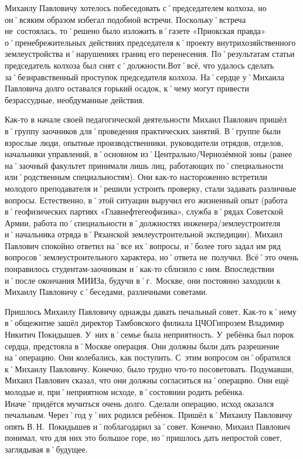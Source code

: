 Михаилу Павловичу хотелось побеседовать с˚председателем колхоза, но он˚всяким образом избегал подобной встречи. Поскольку˚встреча не~состоялась, то˚решено было изложить в˚газете «Приокская правда» о˚пренебрежительных действиях председателя к˚проекту внутрихозяйственного землеустройства и˚нарушениях границ его перенесения. По˚результатам статьи председатель колхоза был снят с˚должности.Вот˚всё, что удалось сделать за˚безнравственный проступок председателя колхоза. На˚сердце у˚Михаила Павловича долго оставался горький осадок, к˚чему могут привести безрассудные, необдуманные действия.

Как-то в начале своей педагогической деятельности Михаил Павлович пришёл в˚группу заочников для˚проведения практических занятий. В˚группе были взрослые люди, опытные производственники, руководители отрядов, отделов, начальники управлений, в˚основном из˚Центрально\-/Чернозёмной зоны (ранее на˚заочный факультет принимали лишь лиц, работающих по˚специальности или˚родственным специальностям). Они как-то настороженно встретили  молодого преподавателя и˚решили устроить проверку, стали задавать различные вопросы. Естественно, в˚этой ситуации выручил его жизненный опыт (работа в˚геофизических партиях «Главнефтегеофизика», служба в˚рядах Советской Армии, работа по˚специальности в˚должностях инженера\-/землеустроителя и˚начальника отряда в˚Рязанской землеустроительной экспедиции). Михаил Павлович спокойно ответил на˚все их˚вопросы, и˚более того задал им ряд вопросов˚землеустроительного характера, но˚ответа не~получил. Всё˚это очень понравилось студентам-заочникам и˚как-то сблизило с ним. Впоследствии и˚после окончания МИИЗа, будучи в˚г.~Москве, они постоянно заходили к Михаилу Павловичу с˚беседами, различными советами. 

Пришлось Михаилу Павловичу однажды давать печальный совет. Как-то к˚нему в˚общежитие зашёл директор Тамбовского филиала ЦЧОГипрозем Владимир Никитич Покидышев. У~них в˚семье была неприятность. У~ребёнка был порок сердца, предстояла в˚Москве операция. Они должны были дать разрешение на˚операцию. Они колебались, как поступить. С~этим вопросом он˚обратился к˚Михаилу Павловичу. Конечно, было трудно что-то посоветовать. Подумавши, Михаил Павлович сказал, что они должны согласиться на˚операцию. Они ещё молодые и, при˚неприятном исходе, в˚состоянии родить ребёнка. Иначе˚придётся мучиться очень долго. Сделали операцию, исход оказался печальным. Через˚год у˚них родился ребёнок. Пришёл к˚Михаилу Павловичу опять В.\,Н.~Покидышев и˚поблагодарил за˚совет. Конечно, Михаил Павлович понимал, что для них это большое горе, но˚пришлось дать непростой совет, заглядывая в˚будущее.


